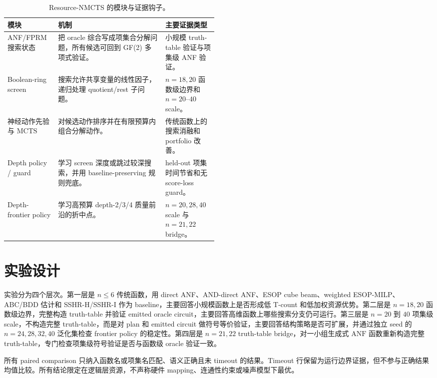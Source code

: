 \documentclass[UTF8,fontset=macnew,11pt]{ctexart}
\newcommand{\method}{Resource-NMCTS}
\newcommand{\anf}{\ensuremath{\mathrm{ANF}}}
\newcommand{\mcts}{\ensuremath{\mathrm{MCTS}}}
\newcommand{\ttable}{truth-table}
\begin{document}
\begin{table}[H]
\centering
\small
\caption{\method{} 的模块与证据钩子。}
\label{tab:modules}
\begin{tabularx}{\linewidth}{>{\raggedright\arraybackslash}p{0.24\linewidth}>{\raggedright\arraybackslash}X>{\raggedright\arraybackslash}p{0.25\linewidth}}
\toprule
模块 & 机制 & 主要证据类型 \\
\midrule
ANF/FPRM 搜索状态 & 把 oracle 综合写成项集合分解问题，所有候选可回到 GF(2) 多项式验证。 & 小规模 truth-table 验证与项集级 ANF 验证。 \\
Boolean-ring screen & 搜索允许共享变量的线性因子，递归处理 quotient/rest 子问题。 & $n=18,20$ 函数级边界和 $n=20$--$40$ scale。 \\
神经动作先验与 \mcts{} & 对候选动作排序并在有限预算内组合分解动作。 & 传统函数上的搜索消融和 portfolio 改善。 \\
Depth policy / guard & 学习 screen 深度或跳过较深搜索，并用 baseline-preserving 规则兜底。 & held-out 项集时间节省和无 score-loss guard。 \\
Depth-frontier policy & 学习高预算 depth-2/3/4 质量前沿的折中点。 & $n=20,28,40$ scale 与 $n=21,22$ bridge。 \\
\bottomrule
\end{tabularx}
\end{table}

\section{实验设计}

实验分为四个层次。第一层是 $n\leq6$ 传统函数，用 direct ANF、AND-direct ANF、ESOP cube beam、weighted ESOP-MILP、ABC/BDD 估计和 SSHR-H/SSHR-I 作为 baseline，主要回答小规模函数上是否形成低 T-count 和低加权资源优势。第二层是 $n=18,20$ 函数级边界，完整构造 \ttable{} 并验证 emitted oracle circuit，主要回答高维函数上哪些搜索分支仍可运行。第三层是 $n=20$ 到 $40$ 项集级 scale，不构造完整 \ttable{}，而是对 plan 和 emitted circuit 做符号等价验证，主要回答结构策略是否可扩展，并通过独立 seed 的 $n=24,28,32,40$ 泛化集检查 frontier policy 的稳定性。第四层是 $n=21,22$ truth-table bridge，对一小组生成式 \anf{} 函数重新构造完整 \ttable{}，专门检查项集级符号验证是否与函数级 oracle 验证一致。

所有 paired comparison 只纳入函数名或项集名匹配、语义正确且未 timeout 的结果。Timeout 行保留为运行边界证据，但不参与正确结果均值比较。所有结论限定在逻辑层资源，不声称硬件 mapping、连通性约束或噪声模型下最优。
\end{document}
